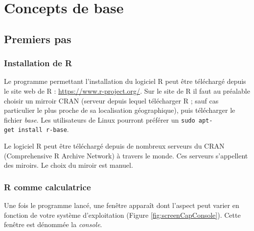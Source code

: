 \documentclass[]{book}
\begin{document}
\hypertarget{part-concepts-de-base}{%
\part{Concepts de base}\label{part-concepts-de-base}}

\hypertarget{premiersPas}{%
\chapter{Premiers pas}\label{premiersPas}}

\hypertarget{installation-de-r}{%
\section{Installation de R}\label{installation-de-r}}

Le programme permettant l'installation du logiciel R peut être téléchargé depuis le site web de R : \url{https://www.r-project.org/}. Sur le site de R il faut au préalable choisir un mirroir CRAN (serveur depuis lequel télécharger R ; sauf cas particulier le plus proche de sa localisation géographique), puis télécharger le fichier \emph{base}. Les utilisateurs de Linux pourront préférer un \texttt{sudo\ apt-get\ install\ r-base}.

Le logiciel R peut être téléchargé depuis de nombreux serveurs du CRAN (Comprehensive R Archive Network) à travers le monde. Ces serveurs s'appellent des miroirs. Le choix du miroir est manuel.

\hypertarget{r-comme-calculatrice}{%
\section{R comme calculatrice}\label{r-comme-calculatrice}}

Une fois le programme lancé, une fenêtre apparaît dont l'aspect peut varier en fonction de votre système d'exploitation (Figure \ref{fig:screenCapConsole}). Cette fenêtre est dénommée la \emph{console}.
\end{document}
